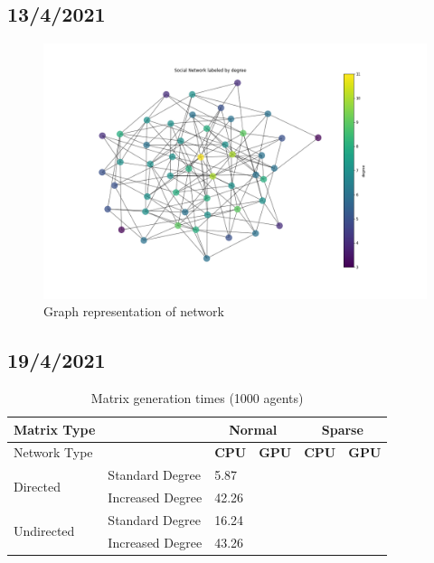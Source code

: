 \documentclass{article}
\begin{document}
\subsection{13/4/2021}
\begin{center}
    \begin{figure}[!htbp]
        \centering
        \includegraphics[width=1.3\textwidth]{ThesisKI/Images/DegreeGraph.png}
        \caption{Graph representation of network}
        \label{graph:degree}
    \end{figure}
\end{center}

\subsection{19/4/2021}
\begin{table}[H]
    \centering
    \begin{tabular}{llllll}
        \toprule
        Matrix Type &  & \multicolumn{2}{c}{Normal} & \multicolumn{2}{c}{Sparse}\\
        \midrule 
        Network Type &  &\textbf{CPU} & \textbf{GPU} & \textbf{CPU} & \textbf{GPU} \\
        \midrule
        \multirow{2}{*}{Directed} & Standard Degree & 5.87 & & & \\
                                          & Increased Degree & 42.26 & & & \\
        \multirow{2}{*}{Undirected} & Standard Degree & 16.24 & & & \\
                                  & Increased Degree & 43.26 & & & \\
        \bottomrule
    \end{tabular}
    \label{table:gen_1000_rest}
    \caption{Matrix generation times (1000 agents)}
\end{table}
\end{document}
